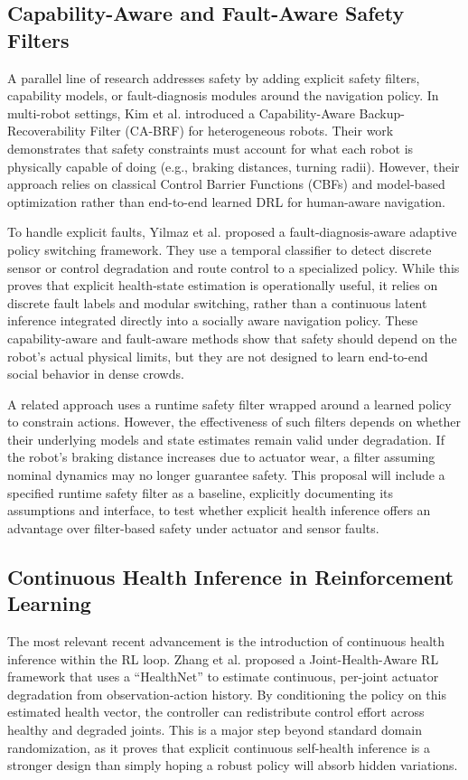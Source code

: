 \documentclass[11pt,a4paper]{article}
\begin{document}
\subsection{Capability-Aware and Fault-Aware Safety Filters}
A parallel line of research addresses safety by adding explicit safety filters, capability models, or fault-diagnosis modules around the navigation policy. In multi-robot settings, Kim et al. \cite{kim2026capability} introduced a Capability-Aware Backup-Recoverability Filter (CA-BRF) for heterogeneous robots. Their work demonstrates that safety constraints must account for what each robot is physically capable of doing (e.g., braking distances, turning radii). However, their approach relies on classical Control Barrier Functions (CBFs) and model-based optimization rather than end-to-end learned DRL for human-aware navigation.

To handle explicit faults, Yilmaz et al. \cite{yilmaz2026fault} proposed a fault-diagnosis-aware adaptive policy switching framework. They use a temporal classifier to detect discrete sensor or control degradation and route control to a specialized policy. While this proves that explicit health-state estimation is operationally useful, it relies on discrete fault labels and modular switching, rather than a continuous latent inference integrated directly into a socially aware navigation policy. These capability-aware and fault-aware methods show that safety should depend on the robot's actual physical limits, but they are not designed to learn end-to-end social behavior in dense crowds.

A related approach uses a runtime safety filter wrapped around a learned policy to constrain actions. However, the effectiveness of such filters depends on whether their underlying models and state estimates remain valid under degradation. If the robot's braking distance increases due to actuator wear, a filter assuming nominal dynamics may no longer guarantee safety. This proposal will include a specified runtime safety filter as a baseline, explicitly documenting its assumptions and interface, to test whether explicit health inference offers an advantage over filter-based safety under actuator and sensor faults.

\subsection{Continuous Health Inference in Reinforcement Learning}
The most relevant recent advancement is the introduction of continuous health inference within the RL loop. Zhang et al. \cite{zhang2026joint} proposed a Joint-Health-Aware RL framework that uses a ``HealthNet'' to estimate continuous, per-joint actuator degradation from observation-action history. By conditioning the policy on this estimated health vector, the controller can redistribute control effort across healthy and degraded joints. This is a major step beyond standard domain randomization, as it proves that explicit continuous self-health inference is a stronger design than simply hoping a robust policy will absorb hidden variations.
\end{document}

